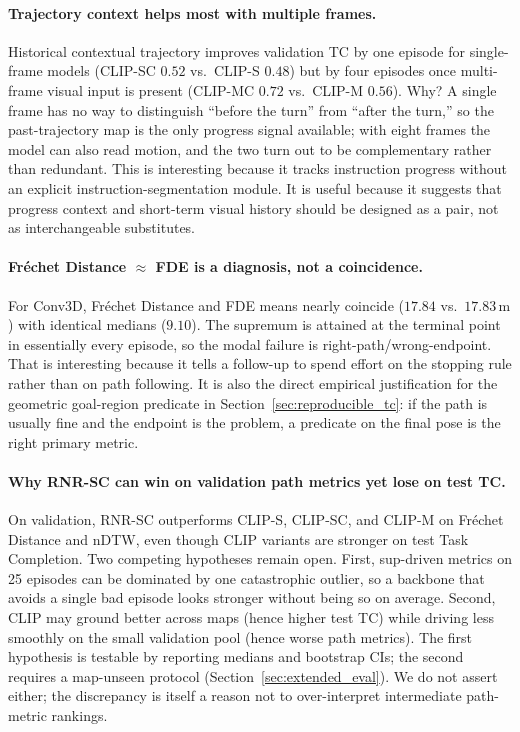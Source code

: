 \paragraph{Trajectory context helps most with multiple frames.}
Historical contextual trajectory improves validation TC by one episode for single-frame models (CLIP-SC $0.52$ vs.\ CLIP-S $0.48$) but by four episodes once multi-frame visual input is present (CLIP-MC $0.72$ vs.\ CLIP-M $0.56$). Why? A single frame has no way to distinguish ``before the turn'' from ``after the turn,'' so the past-trajectory map is the only progress signal available; with eight frames the model can also read motion, and the two turn out to be complementary rather than redundant. This is interesting because it tracks instruction progress without an explicit instruction-segmentation module. It is useful because it suggests that progress context and short-term visual history should be designed as a pair, not as interchangeable substitutes.

\paragraph{Fr\'{e}chet Distance $\approx$ FDE is a diagnosis, not a coincidence.}
For Conv3D, Fr\'{e}chet Distance and FDE means nearly coincide ($17.84$ vs.\ $17.83\,\mathrm{m}$) with identical medians ($9.10$). The supremum is attained at the terminal point in essentially every episode, so the modal failure is right-path/wrong-endpoint. That is interesting because it tells a follow-up to spend effort on the stopping rule rather than on path following. It is also the direct empirical justification for the geometric goal-region predicate in Section~\ref{sec:reproducible_tc}: if the path is usually fine and the endpoint is the problem, a predicate on the final pose is the right primary metric.

\paragraph{Why RNR-SC can win on validation path metrics yet lose on test TC.}
On validation, RNR-SC outperforms CLIP-S, CLIP-SC, and CLIP-M on Fr\'{e}chet Distance and nDTW, even though CLIP variants are stronger on test Task Completion. Two competing hypotheses remain open. First, sup-driven metrics on 25 episodes can be dominated by one catastrophic outlier, so a backbone that avoids a single bad episode looks stronger without being so on average. Second, CLIP may ground better across maps (hence higher test TC) while driving less smoothly on the small validation pool (hence worse path metrics). The first hypothesis is testable by reporting medians and bootstrap CIs; the second requires a map-unseen protocol (Section~\ref{sec:extended_eval}). We do not assert either; the discrepancy is itself a reason not to over-interpret intermediate path-metric rankings.

